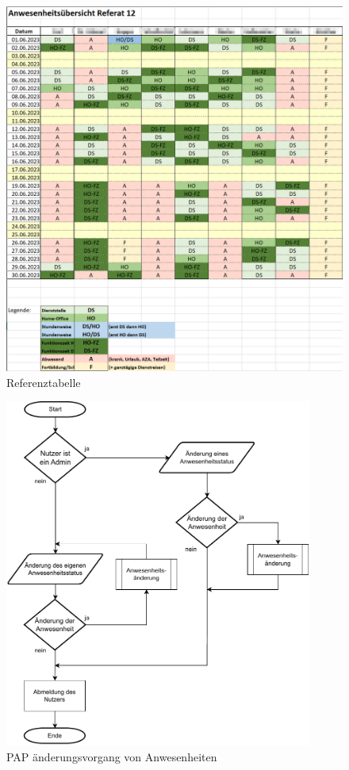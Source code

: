 \begin{figure}[htb]
    \centering
    \includegraphics[page=1,height=1\textwidth]{anhang/abb/Tabelle.png}
    \caption[Beschreibung]{Referenztabelle}
    \label{abb:Ausgangstabelle}
\end{figure}


\begin{figure}[htb]
    \centering
    \includegraphics[width=0.9\textwidth,angle=0]{anhang/abb/PAP_Kurz.pdf}
    \caption[Beschreibung]{PAP änderungsvorgang von Anwesenheiten}
    \label{abb:PAP}
\end{figure}

